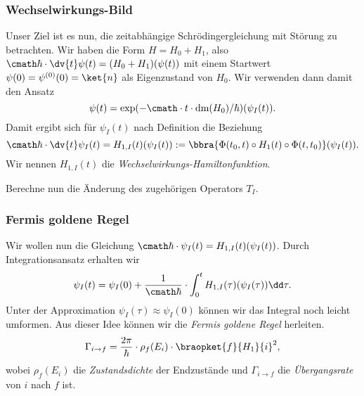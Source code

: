 \documentclass{subfiles}
\begin{document}
        \subsubsection*{Wechselwirkungs-Bild}
            Unser Ziel ist es nun, die zeitabhängige Schrödingergleichung mit Störung zu betrachten. Wir haben die Form $H = H_0 + H_1$, also $\cmath\hbar\cdot\dv{t}\psi(t) = (H_0 + H_1)(\psi(t))$ mit einem Startwert $\psi(0) = \psi^{(0)}(0) = \ket{n}$ als Eigenzustand von $H_0$. Wir verwenden dann damit den Ansatz
            \[
                \psi(t) = \exp(-\cmath\cdot t\cdot \text{dm}(H_0)/\hbar)(\psi_I(t)).
            \]
            Damit ergibt sich für $\psi_I(t)$ nach Definition die Beziehung
            \[
                \cmath\hbar\cdot\dv{t}\psi_I(t) = H_{1,I}(t)(\psi_I(t)) := \bbra{\Phi(t_0,t)\circ H_1(t)\circ\Phi(t,t_0)}(\psi_I(t)).
            \]
            Wir nennen $H_{1,I}(t)$ die \emph{Wechselwirkungs-Hamiltonfunktion}.
            \begin{Aufgabe}
                \nr{} Berechne nun die Änderung des zugehörigen Operators $T_I$. 
            \end{Aufgabe}

        \subsubsection*{Fermis goldene Regel}
            Wir wollen nun die Gleichung $\cmath\hbar\cdot\psi_I(t) = H_{1,I}(t)(\psi_I(t))$. Durch Integrationsansatz erhalten wir 
            \[
                \psi_I(t) = \psi_I(0) + \frac{1}{\cmath\hbar}\cdot\int_0^t H_{1,I}(\tau)(\psi_I(\tau))\dd\tau.
            \]
            Unter der Approximation $\psi_I(\tau)\approx \psi_I(0)$ können wir das Integral noch leicht umformen. Aus dieser Idee können wir die \emph{Fermis goldene Regel} herleiten.
            \[
                \Gamma_{i\to f} = \frac{2\pi}{\hbar}\cdot\rho_f(E_i)\cdot\braopket{f}{H_1}{i}^2,
            \]
            wobei $\rho_f(E_i)$ die \emph{Zustandsdichte} der Endzustände und $\Gamma_{i\to f}$ die \emph{Übergangsrate} von $i$ nach $f$ ist.



 
\end{document}
